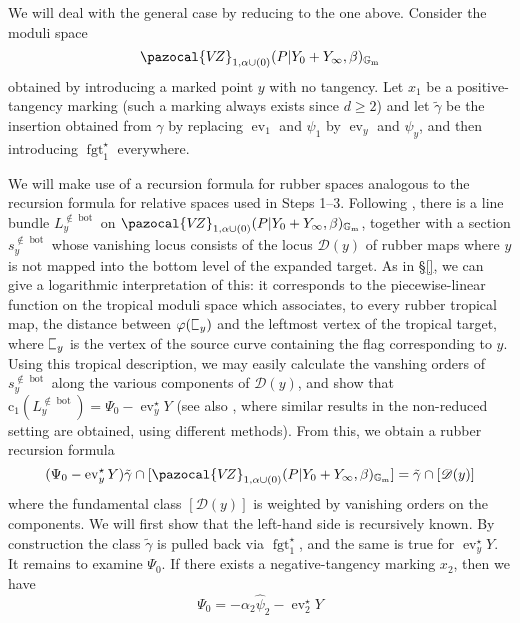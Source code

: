 \documentclass[11pt]{amsart}
\newcommand{\sqC}{\scalebox{0.8}[1.3]{$\sqsubset$}}
\newcommand{\VZ}{\pazocal{V\!Z}}
\newcommand{\st}{\star}
\newcommand{\Gm}{\mathbb{G}_{\text{m}}}
\newcommand{\ev}{\operatorname{ev}}
\newcommand{\fgt}{\operatorname{fgt}}
\newcommand{\Dcal}{\mathcal{D}}
\newcommand{\cchern}{\mathrm{c}}
\theoremstyle{definition}
\theoremstyle{definition}
\begin{document}
We will deal with the general case by reducing to the one above. Consider the moduli space
\begin{equation*}\label{step 4 recursion space} \VZ_{1,\alpha\cup (0)}(P|Y_0+Y_\infty,\beta)_{\Gm}\end{equation*}
obtained by introducing a marked point $y$ with no tangency. Let $x_1$ be a positive-tangency marking (such a marking always exists since $d \geq 2$) and let $\tilde\gamma$ be the insertion obtained from $\gamma$ by replacing $\ev_1$ and $\psi_1$ by $\ev_y$ and $\psi_y$, and then introducing $\fgt_{1}^\st$ everywhere.

We will make use of a recursion formula for rubber spaces analogous to the recursion formula for relative spaces used in Steps 1--3. Following \cite{EKatz}, there is a line bundle $L_y^{\not\in \operatorname{bot}}$ on $\VZ_{1,\alpha\cup (0)}(P|Y_0+Y_\infty,\beta)_{\Gm}$, together with a section $s_y^{\not\in\operatorname{bot}}$ whose vanishing locus consists of the locus $\Dcal(y)$ of rubber maps where $y$ is not mapped into the bottom level of the expanded target. As in \S \ref{}, we can give a logarithmic interpretation of this: it corresponds to the piecewise-linear function on the tropical moduli space which associates, to every rubber tropical map, the distance between $\varphi(\sqC_y)$ and the leftmost vertex of the tropical target, where $\sqC_y$ is the vertex of the source curve containing the flag corresponding to $y$. Using this tropical description, we may easily calculate the vanshing orders of $s_y^{\not\in\operatorname{bot}}$ along the various components of $\Dcal(y)$, and show that $\cchern_1(L_y^{\not\in\operatorname{bot}}) = \Psi_0 - \ev_y^\st Y$ (see also \cite{EKatzLB}, where similar results in the non-reduced setting are obtained, using different methods). From this, we obtain a rubber recursion formula
\begin{equation}\label{step 4 recursion} (\Psi_0 - \ev_y^\st Y) \tilde\gamma \cap [\VZ_{1,\alpha\cup(0)}(P|Y_0+Y_\infty,\beta)_{\Gm}] = \tilde\gamma \cap [\Dcal(y)]\end{equation}
where the fundamental class $[\Dcal(y)]$ is weighted by vanishing orders on the components. We will first show that the left-hand side is recursively known. By construction the class $\tilde\gamma$ is pulled back via $\fgt_{1}^\st$, and the same is true for $\ev_y^\st Y$. It remains to examine $\Psi_0$. If there exists a negative-tangency marking $x_2$, then we have \cite[Construction 5.1.17]{GathmannThesis}
\begin{equation*}\label{Psi0 formula} \Psi_0 = -\alpha_2 \hat\psi_2 - \ev_2^\st Y \end{equation*}
\end{document}
